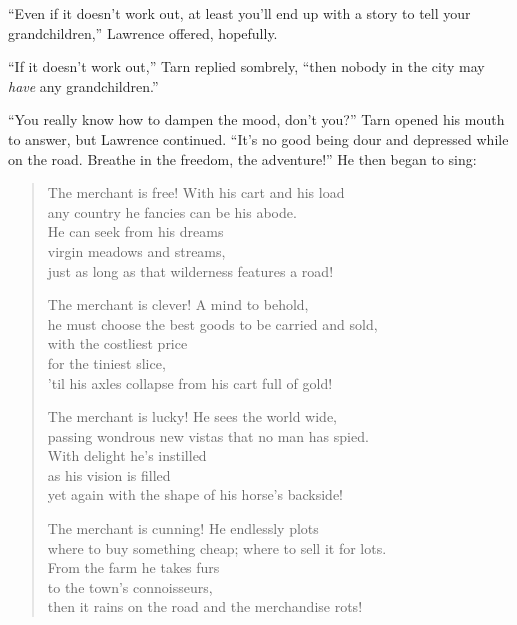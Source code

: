 ``Even if it doesn't work out, at least you'll end up with a story to tell your grandchildren,'' Lawrence offered, hopefully.

``If it doesn't work out,'' Tarn replied sombrely, ``then nobody in the city may \emph{have} any grandchildren.''

``You really know how to dampen the mood, don't you?''  Tarn opened his mouth to answer, but Lawrence continued. ``It's no good being dour and depressed while on the road.  Breathe in the freedom, the adventure!''  He then began to sing:

\begin{verse}
The merchant is free! With his cart and his load\\
any country he fancies can be his abode.\\
\hspace{2em}He can seek from his dreams\\
\hspace{2em}virgin meadows and streams,\\
just as long as that wilderness features a road!

The merchant is clever!  A mind to behold,\\
he must choose the best goods to be carried and sold,\\
\hspace{2em}with the costliest price\\
\hspace{2em}for the tiniest slice,\\
'til his axles collapse from his cart full of gold!

The merchant is lucky!  He sees the world wide,\\
passing wondrous new vistas that no man has spied.\\
\hspace{2em}With delight he's instilled\\
\hspace{2em}as his vision is filled\\
yet again with the shape of his horse's backside!

The merchant is cunning!  He endlessly plots\\
where to buy something cheap; where to sell it for lots.\\
\hspace{2em}From the farm he takes furs\\
\hspace{2em}to the town's connoisseurs,\\
then it rains on the road and the merchandise rots!


\end{verse}
